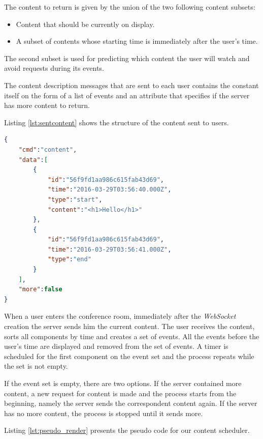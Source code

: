 	The content to return is given by the union of the two following content subsets:
	\begin{itemize}
		\item Content that should be currently on display.
		\item A subset of contents whose starting time is immediately after the user's time.
	\end{itemize}

	The second subset is used for predicting which content the user will watch and avoid requests during its events.

	The content description messages that are sent to each user contains the constant itself on the form of a list of events and an attribute that specifies if the server has more content to return.

	Listing \ref{lst:sentcontent} shows the structure of the content sent to users.

\begin{minipage}{\linewidth}
\begin{lstlisting}[caption={Exampe of content sent to users},label={lst:sentcontent},language=json]
{
	"cmd":"content",
	"data":[
		{
			"id":"56f9fd1aa986c615fab43d69",
			"time":"2016-03-29T03:56:40.000Z",
			"type":"start",
			"content":"<h1>Hello</h1>"
		},
		{
			"id":"56f9fd1aa986c615fab43d69",
			"time":"2016-03-29T03:56:41.000Z",
			"type":"end"
		}
	],
	"more":false
}
\end{lstlisting}
\end{minipage}

	When a user enters the conference room, immediately after the \emph{WebSocket} creation the server sends him the current content. The user receives the content, sorts all components by time and creates a set of events. All the events before the user's time are displayed and removed from the set of events. A timer is scheduled for the first component on the event set and the process repeats while the set is not empty.

	If the event set is empty, there are two options. If the server contained more content, a new request for content is made and the process starts from the beginning, namely the server sends the correspondent content again. If the server has no more content, the process is stopped until it sends more.

	Listing \ref{lst:pseudo_render} presents the pseudo code for our content scheduler.

